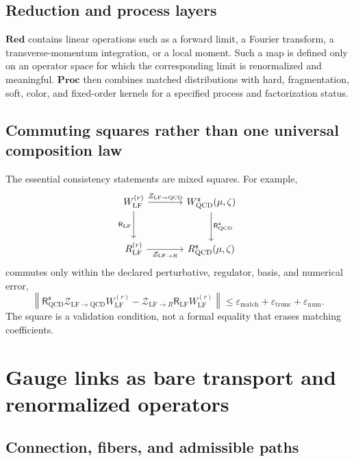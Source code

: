 \documentclass[11pt]{article}
\newcommand{\LF}{\mathrm{LF}}
\newcommand{\Red}{\mathbf{Red}}
\newcommand{\Proc}{\mathbf{Proc}}
\newcommand{\cZ}{\mathcal Z}
\newcommand{\eps}{\varepsilon}
\begin{document}
\subsection{Reduction and process layers}

\(\Red\) contains linear operations such as a forward limit, a Fourier
transform, a transverse-momentum integration, or a local moment.  Such a map
is defined only on an operator space for which the corresponding limit is
renormalized and meaningful.  \(\Proc\) then combines matched distributions
with hard, fragmentation, soft, color, and fixed-order kernels for a specified
process and factorization status.

\subsection{Commuting squares rather than one universal composition law}

The essential consistency statements are mixed squares.  For example,
\begin{equation}
\begin{tikzcd}[column sep=large,row sep=large]
 W_{\LF}^{(r)}
 \arrow[r,"\cZ_{\LF\to\mathrm{QCD}}"]
 \arrow[d,"\mathsf R_{\LF}"']
 & W_{\mathrm{QCD}}^{\mathfrak s}(\mu,\zeta)
 \arrow[d,"\mathsf R_{\mathrm{QCD}}^{\mathfrak s}"]\\
 R_{\LF}^{(r)}
 \arrow[r,"\cZ_{\LF\to R}"']
 & R_{\mathrm{QCD}}^{\mathfrak s}(\mu,\zeta)
\end{tikzcd}
\label{eq:matched-reduction-square}
\end{equation}
commutes only within the declared perturbative, regulator, basis, and
numerical error,
\begin{equation}
 \left\|
 \mathsf R_{\mathrm{QCD}}^{\mathfrak s}
 \cZ_{\LF\to\mathrm{QCD}}W_{\LF}^{(r)}
 -
 \cZ_{\LF\to R}\mathsf R_{\LF}W_{\LF}^{(r)}
 \right\|
 \leq\eps_{\mathrm{match}}+\eps_{\mathrm{trunc}}+\eps_{\mathrm{num}}.
\label{eq:commuting-error-bound}
\end{equation}
The square is a validation condition, not a formal equality that erases
matching coefficients.

\section{Gauge links as bare transport and renormalized operators}
\label{sec:gauge-links}

\subsection{Connection, fibers, and admissible paths}
\end{document}
